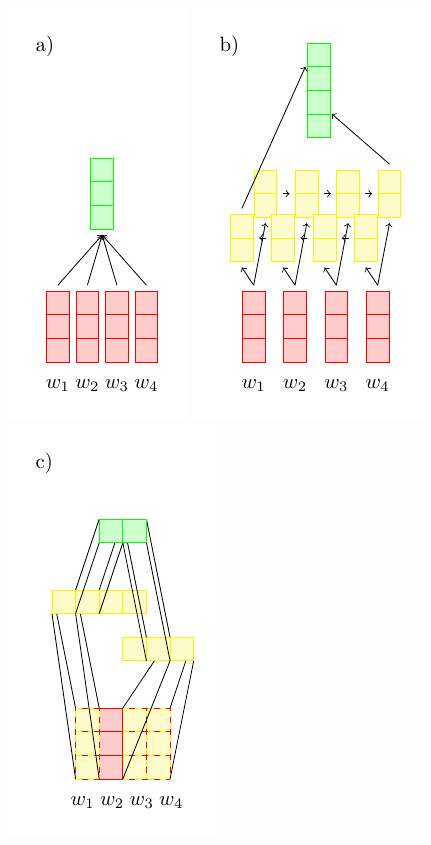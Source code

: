 \begin{figure}
  \center
  \includegraphics[scale=.7]{figures/avgsentencoder.pdf}
  \includegraphics[scale=.7]{figures/rnnsentencoder.pdf}
  \includegraphics[scale=.7]{figures/cnnsentencoder.pdf}

\end{figure}
